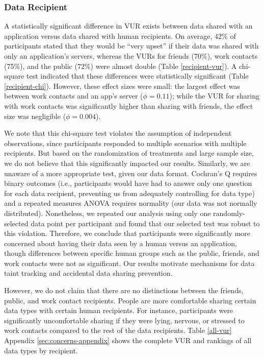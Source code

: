 
\subsubsection{Data Recipient}
A statistically significant difference in VUR exists between data shared with an application versus data shared with human recipients. On average, 42\% of participants stated that they would be ``very upset'' if their data was shared with only an application's servers, whereas the VURs for friends (70\%), work contacts (75\%), and the public (72\%) were almost double (Table \ref{recipient-vur}). A chi-square test indicated that these differences were statistically significant (Table \ref{recipient-chi}). However, these effect sizes were small: the largest effect was between work contacts and an app's server ($\phi=0.11$); while the VUR for sharing with work contacts was significantly higher than sharing with friends, the effect size was negligible ($\phi=0.004$). 

We note that this chi-square test violates the assumption of independent observations, since participants responded to multiple scenarios with multiple recipients. But based on the randomization of treatments and large sample size, we do not believe that this significantly impacted our results. Similarly, we are unaware of a more appropriate test, given our data format. Cochran's Q requires binary outcomes (i.e., participants would have had to answer only one question for each data recipient, preventing us from adequately controlling for data type) and a repeated measures ANOVA requires normality (our data was not normally distributed). Nonetheless, we repeated our analysis using only one randomly-selected data point per participant and found that our selected test was robust to this violation. Therefore, we conclude that participants were significantly more concerned about having their data seen by a human versus an application, though differences between specific human groups such as the public, friends, and work contacts were not as significant. Our results motivate mechanisms for data taint tracking and accidental data sharing prevention.

However, we do not claim that there are no distinctions between the friends, public, and work contact recipients. People are more comfortable sharing certain data types with certain human recipients. For instance, participants were significantly uncomfortable sharing if they were lying, nervous, or stressed to work contacts compared to the rest of the data recipients. Table \ref{all-vur} Appendix \ref{sec:concerns-appendix} shows the  complete VUR and rankings of all data types by recipient.

